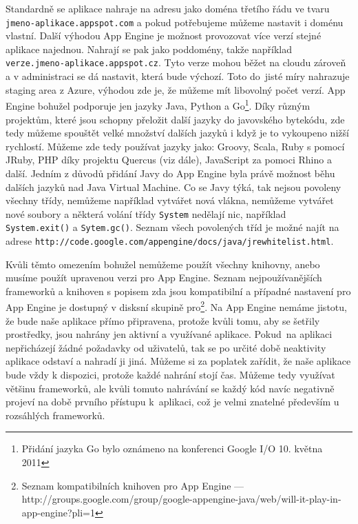 Standardně se aplikace nahraje na adresu jako doména třetího řádu ve
tvaru \\ \verb|jmeno-aplikace.appspot.com| a pokud potřebujeme můžeme nastavit i doménu vlastní. Další výhodou App Engine je možnost provozovat více verzí stejné aplikace najednou. Nahrají se pak jako poddomény, takže například \verb|verze.jmeno-aplikace.appspot.cz|. Tyto verze mohou běžet na cloudu zároveň a v administraci se dá nastavit, která bude výchozí. Toto do~jisté míry nahrazuje staging area z Azure, výhodou zde je, že můžeme mít libovolný počet verzí. App Engine bohužel podporuje jen jazyky Java, Python a Go\footnote{Přidání jazyka Go bylo oznámeno na konferenci Google I/O 10. května 2011}. Díky různým projektům, které jsou schopny přeložit další jazyky do javovského bytekódu, zde tedy můžeme spouštět velké množství dalších jazyků i když je to vykoupeno nižší rychlostí. Můžeme zde tedy používat jazyky jako: Groovy, Scala, Ruby s pomocí JRuby, PHP díky projektu Quercus (viz dále), JavaScript za pomoci Rhino a další. Jedním z důvodů přidání Javy do App Engine byla právě možnost běhu dalších jazyků nad Java Virtual Machine. Co se Javy týká, tak nejsou povoleny všechny třídy, nemůžeme například vytvářet nová vlákna, nemůžeme vytvářet nové soubory a některá volání třídy \verb|System| nedělají nic, například \verb|System.exit()| a \verb|Sytem.gc()|. Seznam všech povolených tříd je možné najít na adrese \verb|http://code.google.com/appengine/docs/java/jrewhitelist.html|. \cite{web:app-engine}

Kvůli těmto omezením bohužel nemůžeme použít všechny knihovny, anebo musíme použít upravenou verzi pro App Engine. Seznam nejpoužívanějších frameworků a knihoven s popisem zda jsou kompatibilní a případné nastavení pro App Engine je dostupný v disksní skupině pro\footnote{Seznam kompatibilních knihoven pro App Engine --- http://groups.google.com/group/google-appengine-java/web/will-it-play-in-app-engine?pli=1}. Na App Engine nemáme jistotu, že bude naše aplikace přímo připravena, protože kvůli tomu, aby se šetřily prostředky, jsou nahrány jen aktivní a využívané aplikace. Pokud~na aplikaci nepřicházejí žádné požadavky od uživatelů, tak se po určité době neaktivity aplikace odstaví a nahradí ji jiná. Můžeme si za poplatek zařídit, že naše aplikace bude vždy k dispozici, protože každé nahrání stojí čas. Můžeme tedy využívat většinu frameworků, ale kvůli tomuto nahrávání se každý kód navíc negativně projeví na době prvního přístupu k~aplikaci, což je velmi znatelné především u rozsáhlých frameworků.

